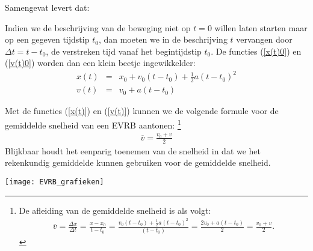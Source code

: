 \documentclass{ximera}
\begin{document}
	Samengevat levert dat:
	
	
	Indien we de beschrijving van de beweging niet op $t=0$ willen laten starten maar op een gegeven tijdstip $t_0$, dan moeten we in de beschrijving $t$ vervangen door $\Delta t= t-t_0$, de verstreken tijd vanaf het begintijdstip $t_0$. De functies (\ref{x(t)0}) en (\ref{v(t)0}) worden dan een klein beetje ingewikkelder:
	\begin{eqnarray}
	x(t)&=&x_0+v_0(t-t_0)+\frac{1}{2}a(t-t_0)^2\label{x(t)}\\
	v(t)&=&v_0+a(t-t_0)\label{v(t)}
	\end{eqnarray}
	
	Met de functies (\ref{x(t)}) en (\ref{v(t)}) kunnen we de volgende formule voor de gemiddelde snelheid van een EVRB aantonen:%
	\footnote{De afleiding van de gemiddelde snelheid is als volgt:
	\begin{eqnarray*}
	\overline{v}=\frac{\Delta x}{\Delta t}=\frac{x-x_0}{t-t_0}=\frac{v_0(t-t_0)+\frac{1}{2}a(t-t_0)^2}{(t-t_0)}=\frac{2v_0+a(t-t_0)}{2}=\frac{v_0+v}{2}.
	\end{eqnarray*}}
	\begin{eqnarray*}
	  \overline{v}=\frac{v_0+v}{2}
	\end{eqnarray*}
	Blijkbaar houdt het eenparig toenemen van de snelheid in dat we het rekenkundig gemiddelde kunnen gebruiken voor de gemiddelde snelheid.
	
	
	\begin{image}
	
	\texttt{[image: EVRB\_grafieken]}
	\end{image}
	
\end{document}
